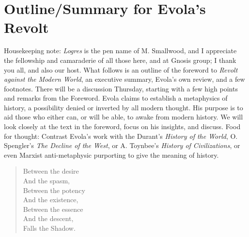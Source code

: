 \section{Outline/Summary for Evola's Revolt}

\begin{quotex}
Housekeeping note: \emph{Logres} is the pen name of M. Smallwood, and I appreciate the fellowship and camaraderie of all those here, and at Gnosis group; I thank you all, and also our host. What follows is an outline of the foreword to \emph{Revolt against the Modern World}, an executive summary, Evola's own review, and a few footnotes. There will be a discussion Thursday, starting with a few high points and remarks from the Foreword. Evola claims to establish a metaphysics of history, a possibility denied or inverted by all modern thought. His purpose is to aid those who either can, or will be able, to awake from modern history. We will look closely at the text in the foreword, focus on his insights, and discuss. Food for thought: Contrast Evola's work with the Durant's \textit{History of the World}, O. Spengler's \textit{The Decline of the West}, or A. Toynbee's \textit{History of Civilizations}, or even Marxist anti-metaphysic purporting to give the meaning of history.

\begin{verse}
Between the desire\\
And the spasm,\\
Between the potency\\
And the existence,\\
Between the essence\\
And the descent,\\
Falls the Shadow. 
\end{verse}

\end{quotex}

